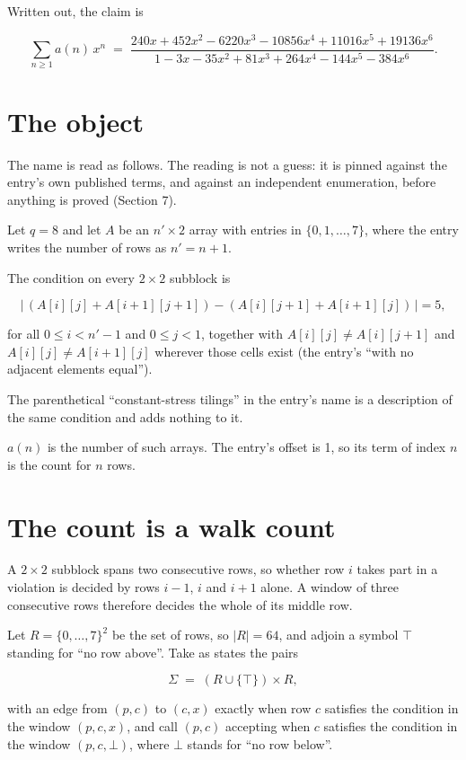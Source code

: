 \documentclass[11pt]{article}
\theoremstyle{definition}
\begin{document}
Written out, the claim is

\[\sum_{n \ge 1} a(n)\,x^n \;=\; \frac{240x + 452x^{2} - 6220x^{3} - 10856x^{4} + 11016x^{5} + 19136x^{6}}{1 - 3x - 35x^{2} + 81x^{3} + 264x^{4} - 144x^{5} - 384x^{6}}.\]

\section{The object}

The name is read as follows. The reading is not a guess: it is pinned against the entry's own published terms, and against an independent enumeration, before anything is proved (Section 7).

Let $q = 8$ and let $A$ be an $n' \times 2$ array with entries in $\{0,1,\dots,7\}$, where the entry writes the number of rows as $n' = n + 1$.

The condition on every $2 \times 2$ subblock is

\[\bigl|\,(A[i][j] + A[i{+}1][j{+}1]) - (A[i][j{+}1] + A[i{+}1][j])\,\bigr| = 5,\]

for all $0 \le i < n'-1$ and $0 \le j < 1$, together with $A[i][j] \ne A[i][j{+}1]$ and $A[i][j] \ne A[i{+}1][j]$ wherever those cells exist (the entry's ``with no adjacent elements equal'').

The parenthetical ``constant-stress tilings'' in the entry's name is a description of the same condition and adds nothing to it.

$a(n)$ is the number of such arrays. The entry's offset is 1, so its term of index $n$ is the count for $n$ rows.

\section{The count is a walk count}

A $2 \times 2$ subblock spans two consecutive rows, so whether row $i$ takes part in a violation is decided by rows $i-1$, $i$ and $i+1$ alone. A window of three consecutive rows therefore decides the whole of its middle row.

Let $R = \{0,\dots,7\}^{2}$ be the set of rows, so $|R| = 64$, and adjoin a symbol $\top$ standing for ``no row above''. Take as states the pairs

\[\Sigma \;=\; (R \cup \{\top\}) \times R,\]

with an edge from $(p,c)$ to $(c,x)$ exactly when row $c$ satisfies the condition in the window $(p,c,x)$, and call $(p,c)$ accepting when $c$ satisfies the condition in the window $(p,c,\bot)$, where $\bot$ stands for ``no row below''.
\end{document}
